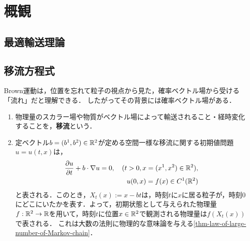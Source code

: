 \documentclass[uplatex,dvipdfmx]{jsreport}
\begin{document}
\section{概観}

\subsection{最適輸送理論}

\begin{definition}
    
\end{definition}

\subsection{移流方程式}

\begin{tcolorbox}[colframe=ForestGreen, colback=ForestGreen!10!white,breakable,colbacktitle=ForestGreen!40!white,coltitle=black,fonttitle=\bfseries\sffamily,
title=]
    Brown運動は，位置を忘れて粒子の視点から見た，確率ベクトル場から受ける「流れ」だと理解できる．
    したがってその背景には確率ベクトル場がある．
\end{tcolorbox}

\begin{definition}\mbox{}
    \begin{enumerate}
        \item 物理量のスカラー場や物質がベクトル場によって輸送されること・経時変化することを，\textbf{移流}という．
        \item 定ベクトル$b=(b^1,b^2)\in\mathbb{R}^2$が定める空間一様な移流に関する初期値問題$u=u(t,x)$は，
        \begin{align*}
            \frac{\partial u}{\partial t}+b\cdot\nabla u=0,\quad(t>0,x=(x^1,x^2)\in\mathbb{R}^2),\\
            u(0,x)=f(x)\in C^1(\mathbb{R}^2)
        \end{align*}
        と表される．このとき，$X_t(x):=x-bt$は，時刻$t$に$x$に居る粒子が，時刻$0$にどこにいたかを表す．よって，初期状態として与えられた物理量$f:\mathbb{R}^2\to\mathbb{R}$を用いて，時刻$t$に位置$x\in\mathbb{R}^2$で観測される物理量は$f(X_t(x))$で表される．
        これは大数の法則に物理的な意味論を与える\ref{thm-law-of-large-number-of-Markov-chain}．
    \end{enumerate}
\end{definition}
\end{document}
